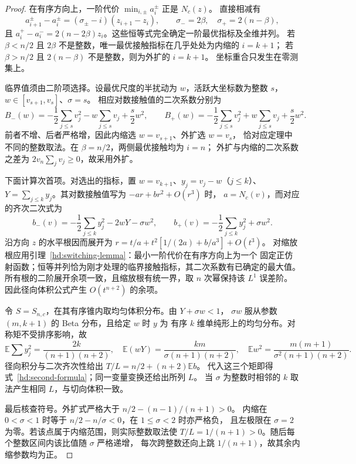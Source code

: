 \begin{proof}
在有序方向上，一阶代价 $\min_{i,\pm}a_i^\pm$ 正是 $N_c(z)$。
直接相减有
\[
 a_{i+1}^\pm-a_i^\pm=(\sigma_\pm-i)(z_{i+1}-z_i),\qquad
 \sigma_-=2\beta,\quad\sigma_+=2(n-\beta),
\]
且 $a_i^+-a_i^-=2(n-2\beta)z_i$。这些恒等式完全确定一阶最优指标及全维并列。
若 $\beta<n/2$ 且 $2\beta$ 不是整数，唯一最优接触指标在几乎处处为内缩的 $i=k+1$；
若 $\beta>n/2$ 且 $2(n-\beta)$ 不是整数，则为外扩的 $i=k+1$。
坐标重合只发生在零测集上。

临界值须由二阶项选择。设最优尺度的半扰动为 $w$，活跃大坐标数为整数 $s$，
$w\in[v_{s+1},v_s]$、$\sigma=s$。
相应对数接触值的二次系数分别为
\[
 B_-(w)=-\frac12\sum_{j\le s}v_j^2-w\sum_{j\le s}v_j+\frac s2w^2,
 \qquad
 B_+(w)=-\frac12\sum_{j\le s}v_j^2+w\sum_{j\le s}v_j+\frac s2w^2.
\]
前者不增、后者严格增，因此内缩选 $w=v_{s+1}$、外扩选 $w=v_s$，
恰对应定理中不同的整数取法。在 $\beta=n/2$，两侧最优接触均为 $i=n$；
外扩与内缩的二次系数之差为 $2v_n\sum_jv_j\ge0$，故采用外扩。

下面计算次首项。对选出的指标，置 $w=v_{k+1}$、$y_j=v_j-w$（$j\le k$）、
$Y=\sum_{j\le k}y_j$。其对数接触值写为 $-ar+br^2+O(r^3)$ 时，
$a=N_c(v)$，而对应的齐次二次式为
\[
 b_-(v)=-\frac12\sum_{j\le k}y_j^2-2wY-\sigma w^2,
 \qquad
 b_+(v)=-\frac12\sum_{j\le k}y_j^2+\sigma w^2.
\]
沿方向 $z$ 的水平根因而展开为
$r=t/a+t^2[1/(2a)+b/a^3]+O(t^3)$。
对缩放根应用引理~\ref{hd:switching-lemma}：最小一阶代价在有序方向上为一个
固定正仿射函数；恒等并列恰为刚才处理的临界接触指标，其二次系数有已确定的最大值。
所有根的二阶展开余项一致，且缩放根有统一界，取 $n$ 次幂保持该 $L^1$ 误差阶。
因此径向体积公式产生 $O(t^{n+2})$ 的余项。

令 $S=S_{n,c}$，在其有序锥内取均匀体积分布。由 $Y+\sigma w<1$，
$\sigma w$ 服从参数 $(m,k+1)$ 的 Beta 分布，且给定 $w$ 时 $y$ 为
有序 $k$ 维单纯形上的均匀分布。对称矩不受排序影响，故
\[
 \mathbb E\sum y_j^2=\frac{2k}{(n+1)(n+2)},\quad
 \mathbb E(wY)=\frac{km}{\sigma(n+1)(n+2)},\quad
 \mathbb E w^2=\frac{m(m+1)}{\sigma^2(n+1)(n+2)}.
\]
径向积分与二次齐次性给出 $T/L=n/2+(n+2)\mathbb E b$。
代入这三个矩即得式~\eqref{hd:second-formula}；同一变量变换还给出所列 $L$。
当 $\sigma$ 为整数时相邻的 $k$ 取法产生相同 $L$，与切向体积一致。

最后核查符号。外扩式严格大于 $n/2-(n-1)/(n+1)>0$。
内缩在 $0<\sigma<1$ 时等于 $n/2-n/\sigma<0$，在 $1\le\sigma<2$ 时亦严格负，
且左极限在 $\sigma=2$ 为零。若该点属于内缩范围，则实际整数取法使
$T/L=1/(n+1)>0$。随后每个整数区间内该比值随 $\sigma$ 严格递增，
每次跨整数还向上跳 $1/(n+1)$，故其余内缩参数均为正。
\end{proof}

